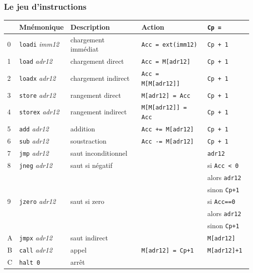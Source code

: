 \begin{frame}[containsverbatim]
  \frametitle{Le jeu d'instructions}


\begin{center}
\footnotesize
\begin{tabular}{|lllll|}
\hline
 & Mnémonique &  Description & Action & \texttt{Cp = } \\
\hline
0 & \texttt{loadi} \emph{imm12} &  \alert{chargement} immédiat &  \verb/Acc = ext(imm12)/ & \verb/Cp + 1/\\
1 & \texttt{load} \emph{adr12} &  chargement direct &  \verb/Acc = M[adr12]/ & \verb/Cp + 1/ \\
2 & \texttt{loadx} \emph{adr12} &  chargement indirect &  \verb/Acc = M[M[adr12]]/& \verb/Cp + 1/ \\
\hline
3 & \texttt{store} \emph{adr12} &  \alert{rangement} direct &  \verb/M[adr12] = Acc/ & \verb/Cp + 1/ \\
4 & \texttt{storex} \emph{adr12} &  rangement indirect &  \verb/M[M[adr12]] = Acc/& \verb/Cp + 1/ \\
\hline
5 & \texttt{add} \emph{adr12} & \alert{addition} & \verb/Acc += M[adr12]/ & \verb/Cp + 1/ \\
6 & \texttt{sub} \emph{adr12} & \alert{soustraction} & \verb/Acc -= M[adr12]/ & \verb/Cp + 1/ \\
\hline
7 & \texttt{jmp} \emph{adr12}  & \alert{saut} inconditionnel & &\verb/adr12/  \\
8 & \texttt{jneg} \emph{adr12}  & saut si négatif & & si \verb/Acc < 0/ \\
  & & & & alors \texttt{adr12} \\
  & & & & sinon \texttt{Cp+1}  \\
9 & \texttt{jzero} \emph{adr12}  & saut si zero & & si \verb/Acc==0/ \\
  & & & & alors \texttt{adr12} \\
  & & & & sinon \texttt{Cp+1}  \\
\hline
A & \texttt{jmpx} \emph{adr12}  & saut indirect & & \verb/M[adr12]/ \\
B & \texttt{call} \emph{adr12}  & \alert{appel} & \verb/M[adr12] = Cp+1/ & \verb/M[adr12]+1 / \\
\hline
C & \texttt{halt 0}  & \alert{arrêt} & &  \\
\hline
\hline
\end{tabular}
\end{center}

\end{frame}


